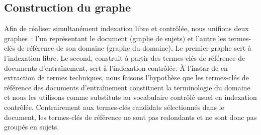   \subsection{Construction du graphe}
  \label{subsec:main-domain_specific_keyphrase_annotation-supervised_automatic_keyphrase_extraction-topiccorank-graph_construction}
    Afin de réaliser simultanément indexation libre et contrôlée, nous unifions
    deux graphes~: l'un représentant le document (graphe de sujets) et l'autre
    les termes-clés de référence de son domaine (graphe du domaine). Le premier
    graphe sert à l'indexation libre. Le second, construit à partir des
    termes-clés de référence de documents d'entraînement, sert à l'indexation
    contrôlée. À l'instar de  en
    extraction de termes techniques, nous faisons l'hypothèse que les
    termes-clés de référence des documents d'entraînement constituent la
    terminologie du domaine et nous les utilisons comme substituts au
    vocabulaire contrôlé usuel en indexation contrôlée. Contrairement aux
    termes-clés candidats sélectionnés dans le document, les termes-clés de
    référence ne sont pas redondants et ne sont donc pas groupés en sujets.

